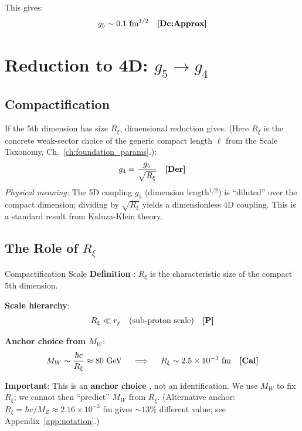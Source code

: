 This gives:
\begin{equation}
g_5 \sim 0.1 \text{ fm}^{1/2} \quad \textbf{[Dc:Approx]}
\end{equation}

\section{Reduction to 4D: $g_5 \to g_4$}
\label{sec:reduction}

\subsection{Compactification}

If the 5th dimension has size $R_\xi$, dimensional reduction gives.
(Here $R_\xi$ is the concrete weak-sector choice of the generic compact length $\ell$
from the Scale Taxonomy, Ch.~\ref{ch:foundation_params}.):
\begin{equation}
g_4 = \frac{g_5}{\sqrt{R_\xi}} \quad \textbf{[Der]}
\end{equation}
\emph{Physical meaning:} The 5D coupling $g_5$ (dimension length$^{1/2}$) is ``diluted''
over the compact dimension; dividing by $\sqrt{R_\xi}$ yields a dimensionless 4D coupling.
This is a standard result from Kaluza-Klein theory.

\subsection{The Role of $R_\xi$}

\begin{mechanism}{Compactification Scale}
\textbf{Definition} \tagP{}:
$R_\xi$ is the characteristic size of the compact 5th dimension.

\textbf{Scale hierarchy}:
\begin{equation}
R_\xi \ll r_p \quad \text{(sub-proton scale)} \quad \textbf{[P]}
\end{equation}

\textbf{Anchor choice from $M_W$}:
\begin{equation}
M_W \sim \frac{\hbar c}{R_\xi} \approx 80 \text{ GeV} \quad \implies \quad
R_\xi \sim 2.5 \times 10^{-3} \text{ fm} \quad \textbf{[Cal]}{}
\end{equation}

\textbf{Important}: This is an \textbf{anchor choice} \tagCal{}, not an identification.
We use $M_W$ to fix $R_\xi$; we cannot then ``predict'' $M_W$ from $R_\xi$.
(Alternative anchor: $R_\xi = \hbar c/M_Z \approx 2.16 \times 10^{-3}$ fm gives
$\sim 13\%$ different value; see Appendix~\ref{app:notation}.)
\end{mechanism}

